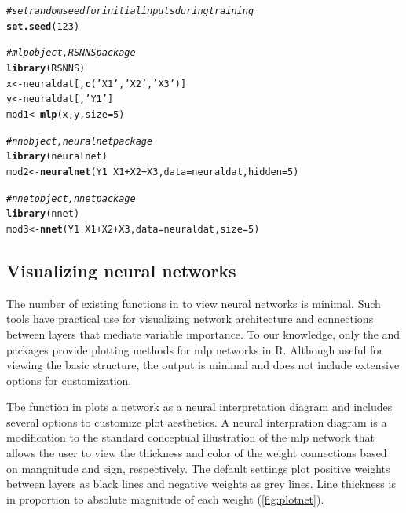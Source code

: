 \documentclass[article,shortnames]{jss}\usepackage[]{graphicx}\usepackage[]{color}
\makeatletter
\newcommand{\hlnum}[1]{\textcolor[rgb]{0.686,0.059,0.569}{#1}}%
\newcommand{\hlstr}[1]{\textcolor[rgb]{0.192,0.494,0.8}{#1}}%
\newcommand{\hlcom}[1]{\textcolor[rgb]{0.678,0.584,0.686}{\textit{#1}}}%
\newcommand{\hlopt}[1]{\textcolor[rgb]{0,0,0}{#1}}%
\newcommand{\hlstd}[1]{\textcolor[rgb]{0.345,0.345,0.345}{#1}}%
\newcommand{\hlkwb}[1]{\textcolor[rgb]{0.69,0.353,0.396}{#1}}%
\newcommand{\hlkwc}[1]{\textcolor[rgb]{0.333,0.667,0.333}{#1}}%
\newcommand{\hlkwd}[1]{\textcolor[rgb]{0.737,0.353,0.396}{\textbf{#1}}}%
\newenvironment{kframe}{%
 \def\at@end@of@kframe{}%
 \ifinner\ifhmode%
  \def\at@end@of@kframe{\end{minipage}}%
  \begin{minipage}{\columnwidth}%
 \fi\fi%
 \def\FrameCommand##1{\hskip\@totalleftmargin \hskip-\fboxsep
 \colorbox{shadecolor}{##1}\hskip-\fboxsep
     \hskip-\linewidth \hskip-\@totalleftmargin \hskip\columnwidth}%
 \MakeFramed {\advance\hsize-\width
   \@totalleftmargin\z@ \linewidth\hsize
   \@setminipage}}%
 {\par\unskip\endMakeFramed%
 \at@end@of@kframe}
\newenvironment{knitrout}{}{} %
\makeatother
\begin{document}
\begin{knitrout}
\color{fgcolor}\begin{kframe}
\begin{alltt}
\hlcom{# set random seed for initial inputs during training}
\hlkwd{set.seed}\hlstd{(}\hlnum{123}\hlstd{)}

\hlcom{# mlp object, RSNNS package}
\hlkwd{library}\hlstd{(RSNNS)}
\hlstd{x} \hlkwb{<-} \hlstd{neuraldat[,} \hlkwd{c}\hlstd{(}\hlstr{'X1'}\hlstd{,} \hlstr{'X2'}\hlstd{,} \hlstr{'X3'}\hlstd{)]}
\hlstd{y} \hlkwb{<-} \hlstd{neuraldat[,} \hlstr{'Y1'}\hlstd{]}
\hlstd{mod1} \hlkwb{<-} \hlkwd{mlp}\hlstd{(x, y,} \hlkwc{size} \hlstd{=} \hlnum{5}\hlstd{)}

\hlcom{# nn object, neuralnet package}
\hlkwd{library}\hlstd{(neuralnet)}
\hlstd{mod2} \hlkwb{<-} \hlkwd{neuralnet}\hlstd{(Y1} \hlopt{~} \hlstd{X1} \hlopt{+} \hlstd{X2} \hlopt{+} \hlstd{X3,} \hlkwc{data} \hlstd{= neuraldat,} \hlkwc{hidden} \hlstd{=} \hlnum{5}\hlstd{)}

\hlcom{#nnet object, nnet package}
\hlkwd{library}\hlstd{(nnet)}
\hlstd{mod3} \hlkwb{<-} \hlkwd{nnet}\hlstd{(Y1} \hlopt{~} \hlstd{X1} \hlopt{+} \hlstd{X2} \hlopt{+} \hlstd{X3,} \hlkwc{data} \hlstd{= neuraldat,} \hlkwc{size} \hlstd{=} \hlnum{5}\hlstd{)}
\end{alltt}
\end{kframe}
\end{knitrout}

\subsection{Visualizing neural networks}

The number of existing functions in  to view neural networks is minimal.  Such tools have practical use for visualizing network architecture and connections between layers that mediate variable importance. To our knowledge, only the  and  packages provide plotting methods for \ac{mlp} networks in R.  Although useful for viewing the basic structure, the output is minimal and does not include extensive options for customization.

Tbe  function in  plots a network as a neural interpretation diagram \citep{Ozesmi99} and includes several options to customize plot aesthetics. A neural interpration diagram is a modification to the standard conceptual illustration of the \ac{mlp} network that allows the user to view the thickness and color of the weight connections based on mangnitude and sign, respectively.  The default settings plot positive weights between layers as black lines and negative weights as grey lines. Line thickness is in proportion to absolute magnitude of each weight (\cref{fig:plotnet}).
\end{document}
